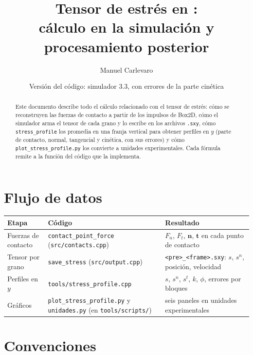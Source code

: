 \documentclass[11pt,a4paper]{article}
\title{Tensor de estrés en \code{unav-walkers}:\\
  cálculo en la simulación y procesamiento posterior}
\author{Manuel Carlevaro}
\date{Versión del código: simulador 3.3, \code{stress\_profile} con errores
  de la parte cinética}
\newcommand{\vect}[1]{\mathbf{#1}}
\newcommand{\n}{\vect{n}}
\newcommand{\tv}{\vect{t}}
\newcommand{\code}[1]{\texttt{#1}}
\begin{document}
\maketitle

\begin{abstract}
  Este documento describe todo el cálculo relacionado con el tensor de
  estrés: cómo se reconstruyen las fuerzas de contacto a partir de los
  impulsos de Box2D, cómo el simulador arma el tensor de cada grano y lo
  escribe en los archivos \code{.sxy}, cómo \code{stress\_profile} los
  promedia en una franja vertical para obtener perfiles en $y$ (parte de
  contacto, normal, tangencial y cinética, con sus errores) y cómo
  \code{plot\_stress\_profile.py} los convierte a unidades experimentales.
  Cada fórmula remite a la función del código que la implementa.
\end{abstract}

\tableofcontents

\section{Flujo de datos}

\begin{center}
\small
\begin{tabular}{>{\raggedright}p{}>{\raggedright}p{}p{}}
  \toprule
  Etapa & Código & Resultado \\
  \midrule
  Fuerzas de contacto & \code{contact\_point\_force} (\code{src/contacts.cpp})
      & $F_n$, $F_t$, $\n$, $\tv$ en cada punto de contacto \\
  Tensor por grano & \code{save\_stress} (\code{src/output.cpp})
      & \code{<pre>\_<frame>.sxy}: $s$, $s^n$, posición, velocidad \\
  Perfiles en $y$ & \code{tools/stress\_profile.cpp}
      & $s$, $s^n$, $s^t$, $k$, $\phi$, errores por bloques \\
  Gráficos & \code{plot\_stress\_profile.py} y \code{unidades.py}
      (en \code{tools/scripts/}) & seis paneles en unidades experimentales \\
  \bottomrule
\end{tabular}
\end{center}

\section{Convenciones}
\end{document}
